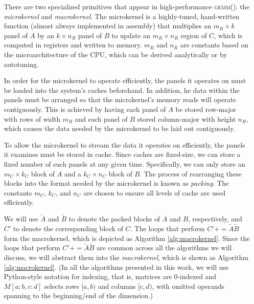 \documentclass[12pt]{article}
\newcommand*{\TO}{\textbf{to}}
\newcommand*{\pluseq}{\mathrel{{+}{=}}}
\newcommand*{\gemm}{{\textsc{gemm()}}}
\begin{document}
There are two specialized primitives that appear in high-performance \gemm{}: the \emph{microkernel} and \emph{macrokernel}.
The microkernel is a highly-tuned, hand-written function (almost always implemented in assembly) that multiplies an $m_R \times k$ panel of $A$ by an $k \times n_R$ panel of $B$ to update an $m_R \times n_R$ region of $C$, which is computed in registers and written to memory.
$m_R$ and $n_R$ are constants based on the microarchitecture of the CPU, which can be derived analytically\cite{Low2016} or by autotuning\cite{Whaley1998}.

In order for the microkernel to operate efficiently, the panels it operates on must be loaded into the system's caches beforehand.
In addition, he data within the panels must be arranged so that the microkernel's memory reads will operate contiguously.
This is achieved by having each panel of $A$ be stored row-major with rows of width $m_R$ and each panel of $B$ stored column-major with height $n_R$, which causes the data needed by the microkernel to be laid out contiguously.

To allow the microkernel to stream the data it operates on efficiently, the panels it examines must be stored in cache.
Since caches are fixed-size, we can store a fixed number of such panels at any given time.
Specifically, we can only store an $m_C \times k_C$ block of $A$ and a $k_C \times n_C$ block of $B$.
The process of rearranging these blocks into the format needed by the microkernel is known as \emph{packing}.
The constants $m_C$, $k_C$, and $n_C$ are chosen to ensure all levels of cache are used efficiently.

We will use $\tilde{A}$ and $\tilde{B}$ to denote the packed blocks of $A$ and $B$, respectively, and $C'$ to denote the corresponding block of $C$.
The loops that perform $C' \pluseq \tilde{A}\tilde{B}$ form the macrokernel, which is depicted as Algorithm \ref{alg:macrokernel}.
Since the loops that perform $C' \pluseq \tilde{A}\tilde{B}$ are common across all the algorithms we will discuss, we will abstract them into the \emph{macrokernel}, which is shown as Algorithm \ref{alg:macrokernel}.
(In all the algorithms presented in this work, we will use Python-style notation for indexing, that is, matrices are 0-indexed and   $M[a:b, c:d]$ selects rows $[a, b)$ and columns $[c, d)$, with omitted operands spanning to the beginning/end of the dimension.)

\begin{algorithm}
  \caption{The macrokernel of a high-performance \gemm{} implementation}
  \label{alg:macrokernel}
  \begin{tikzpicture}
    
  \end{tikzpicture}
  \begin{algorithmic}
    \For{$j \gets 0, n_R, \ldots$ \TO{} $n_C$}
    \For{$i \gets 0, m_R, \ldots$ \TO{} $m_C$}
    \State{$C'[i:i + m_R, j:j + n_R] \pluseq \tilde{A}[i:i+m_R,:] \cdot \tilde{B}[:,j:j+n_R]$}
    \EndFor{}
    \EndFor{}
    \EndProcedure{}
  \end{algorithmic}
\end{algorithm}
\end{document}
